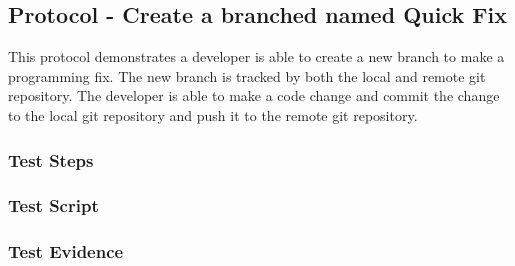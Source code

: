 \newpage
\subsection{Protocol - Create a branched named Quick Fix}
This protocol demonstrates a developer is able to create a new branch to make a
programming fix.  The new branch is tracked by both the local and remote git
repository.  The developer is able to make a code change and commit the change
to the local git repository and push it to the remote git repository.

\subsubsection{Test Steps}
      {}
      {}

\newpage
\subsubsection{Test Script}


\newpage
\subsubsection{Test Evidence}
      {}
      {}
